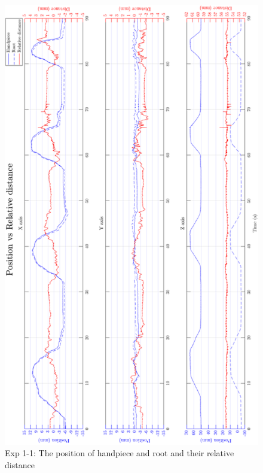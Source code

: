 \begin{figure}[htbp]
\begin{center}
\includegraphics[width=0.9\linewidth]{Images/exp/exp1_1_1.png}
\caption{Exp 1-1: The position of handpiece and root and their relative distance}
\label{fig: exp1_1_1}
\end{center}
\end{figure}	
	
